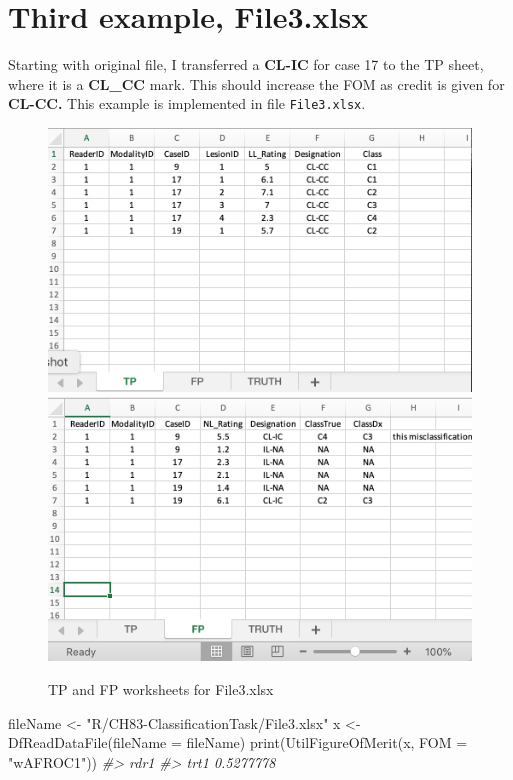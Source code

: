 \documentclass[
]{book}
\newenvironment{Shaded}{\begin{snugshade}}{\end{snugshade}}
\newcommand{\AttributeTok}[1]{\textcolor[rgb]{0.77,0.63,0.00}{#1}}
\newcommand{\CommentTok}[1]{\textcolor[rgb]{0.56,0.35,0.01}{\textit{#1}}}
\newcommand{\FunctionTok}[1]{\textcolor[rgb]{0.00,0.00,0.00}{#1}}
\newcommand{\NormalTok}[1]{#1}
\newcommand{\OtherTok}[1]{\textcolor[rgb]{0.56,0.35,0.01}{#1}}
\newcommand{\StringTok}[1]{\textcolor[rgb]{0.31,0.60,0.02}{#1}}
\begin{document}
\hypertarget{classification-tasks-example3}{%
\section{Third example, File3.xlsx}\label{classification-tasks-example3}}

Starting with original file, I transferred a \textbf{CL-IC} for case 17 to the TP sheet, where it is a \textbf{CL\_CC} mark. This should increase the FOM as credit is given for \textbf{CL-CC.} This example is implemented in file \texttt{File3.xlsx}.

\begin{figure}

{\centering \includegraphics[width=0.5\linewidth,height=0.2\textheight]{images/classification/File3TP} \includegraphics[width=0.5\linewidth,height=0.2\textheight]{images/classification/File3FP} 

}

\caption{TP and FP worksheets for File3.xlsx}\label{fig:File3TPFP}
\end{figure}

\begin{Shaded}
\begin{Highlighting}[]
\NormalTok{fileName }\OtherTok{\textless{}{-}} \StringTok{"R/CH83{-}ClassificationTask/File3.xlsx"}
\NormalTok{x }\OtherTok{\textless{}{-}} \FunctionTok{DfReadDataFile}\NormalTok{(}\AttributeTok{fileName =}\NormalTok{ fileName)}
\FunctionTok{print}\NormalTok{(}\FunctionTok{UtilFigureOfMerit}\NormalTok{(x, }\AttributeTok{FOM =} \StringTok{"wAFROC1"}\NormalTok{))}
\CommentTok{\#\textgreater{}           rdr1}
\CommentTok{\#\textgreater{} trt1 0.5277778}
\end{Highlighting}
\end{Shaded}
\end{document}

